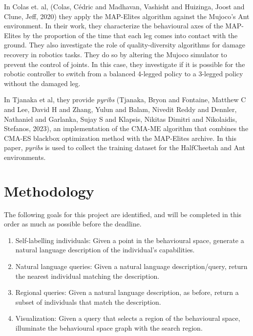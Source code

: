 \documentclass[11pt]{article}
\begin{document}
In Colas et. al, (Colas, Cédric and Madhavan, Vashisht and Huizinga, Joost and Clune, Jeff, 2020) they apply the MAP-Elites algorithm against the Mujoco's Ant environment. In their work,
they characterize the behavioural axes of the MAP-Elites by the proportion of the time that each leg comes into
contact with the ground. They also investigate the role of quality-diversity algorithms for damage recovery in robotics tasks.
They do so by altering the Mujoco simulator to prevent the control of joints. In this case, they investigate
if it is possible for the robotic controller to switch from a balanced 4-legged policy to a 3-legged policy
without the damaged leg.

In Tjanaka et al, they provide \emph{pyribs} (Tjanaka, Bryon and Fontaine, Matthew C and Lee, David H and Zhang, Yulun and Balam, Nivedit Reddy and Dennler, Nathaniel and Garlanka, Sujay S and Klapsis, Nikitas Dimitri and Nikolaidis, Stefanos, 2023), an implementation of the CMA-ME algorithm that combines the CMA-ES blackbox optimization method with
the MAP-Elites archive. In this paper, \emph{pyribs} is used to collect the training dataset for the HalfCheetah and Ant environments.

\section{Methodology}
\label{sec:org64b4ed7}

The following goals for this project are identified, and will be completed in this order as much as possible
before the deadline.

\begin{enumerate}
\item Self-labelling individuals: Given a point in the behavioural space, generate a natural language description
of the individual's capabilities.

\item Natural language queries: Given a natural language description/query, return the nearest individual
matching the description.

\item Regional queries: Given a natural language description, as before, return a subset of individuals
that match the description.

\item Visualization: Given a query that selects a region of the behavioural space, illuminate the behavioural
space graph with the search region.
\end{enumerate}
\end{document}
